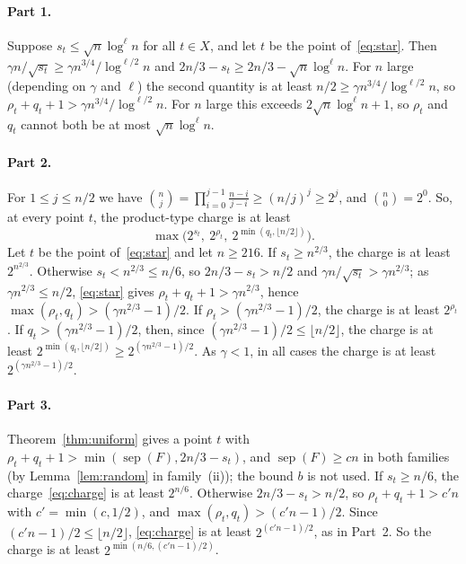 \documentclass[11pt,a4paper]{article}
\theoremstyle{definition}
\theoremstyle{remark}
\newcommand{\sep}{\operatorname{sep}}
\begin{document}
\paragraph{Part 1.} Suppose $s_t\le\sqrt n\log^\ell n$ for all $t\in X$, and let $t$ be the
point of~\eqref{eq:star}. Then
$\gamma n/\sqrt{s_t}\ge\gamma n^{3/4}/\log^{\ell/2}n$ and
$2n/3-s_t\ge2n/3-\sqrt n\log^\ell n$. For $n$ large (depending on $\gamma$ and $\ell$) the
second quantity is at least $n/2\ge\gamma n^{3/4}/\log^{\ell/2}n$, so
$\rho_t+q_t+1>\gamma n^{3/4}/\log^{\ell/2}n$. For $n$ large this exceeds
$2\sqrt n\log^\ell n+1$, so $\rho_t$ and $q_t$ cannot both be at most $\sqrt n\log^\ell n$.

\paragraph{Part 2.} For $1\le j\le n/2$ we have
$\binom nj=\prod_{i=0}^{j-1}\frac{n-i}{j-i}\ge(n/j)^j\ge2^j$, and $\binom n0=2^0$. So, at
every point $t$, the product-type charge is at least
\begin{equation}\label{eq:charge}
\max\bigl(2^{s_t},\ 2^{\rho_t},\ 2^{\min(q_t,\lfloor n/2\rfloor)}\bigr).
\end{equation}
Let $t$ be the point of~\eqref{eq:star} and let $n\ge216$. If $s_t\ge n^{2/3}$, the charge
is at least $2^{n^{2/3}}$. Otherwise $s_t<n^{2/3}\le n/6$, so $2n/3-s_t>n/2$ and
$\gamma n/\sqrt{s_t}>\gamma n^{2/3}$; as $\gamma n^{2/3}\le n/2$, \eqref{eq:star} gives
$\rho_t+q_t+1>\gamma n^{2/3}$, hence $\max(\rho_t,q_t)>(\gamma n^{2/3}-1)/2$. If
$\rho_t>(\gamma n^{2/3}-1)/2$, the charge is at least $2^{\rho_t}$. If
$q_t>(\gamma n^{2/3}-1)/2$, then, since $(\gamma n^{2/3}-1)/2\le\lfloor n/2\rfloor$, the
charge is at least $2^{\min(q_t,\lfloor n/2\rfloor)}\ge2^{(\gamma n^{2/3}-1)/2}$. As
$\gamma<1$, in all cases the charge is at least $2^{(\gamma n^{2/3}-1)/2}$.

\paragraph{Part 3.} Theorem~\ref{thm:uniform} gives a point $t$ with
$\rho_t+q_t+1>\min(\sep(F),2n/3-s_t)$, and $\sep(F)\ge cn$ in both families (by
Lemma~\ref{lem:random} in family~(ii)); the bound $b$ is not used. If $s_t\ge n/6$, the
charge~\eqref{eq:charge} is at least $2^{n/6}$. Otherwise $2n/3-s_t>n/2$, so
$\rho_t+q_t+1>c'n$ with $c'=\min(c,1/2)$, and $\max(\rho_t,q_t)>(c'n-1)/2$. Since
$(c'n-1)/2\le\lfloor n/2\rfloor$, \eqref{eq:charge} is at least $2^{(c'n-1)/2}$, as in
Part~2. So the charge is at least $2^{\min(n/6,(c'n-1)/2)}$.
\end{document}
